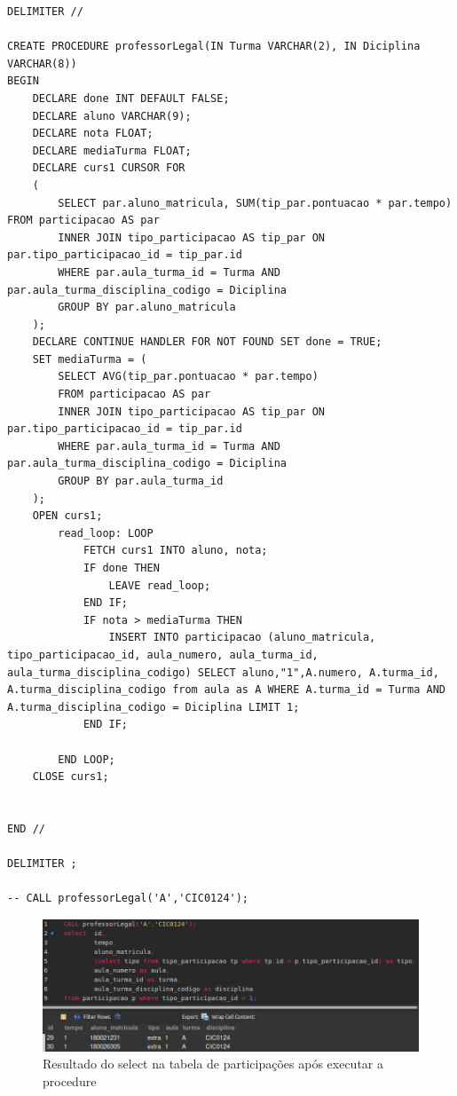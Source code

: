 \documentclass[12pt]{article}
\begin{document}
\begin{lstlisting}
DELIMITER //

CREATE PROCEDURE professorLegal(IN Turma VARCHAR(2), IN Diciplina VARCHAR(8))
BEGIN
    DECLARE done INT DEFAULT FALSE;
    DECLARE aluno VARCHAR(9);
    DECLARE nota FLOAT;
    DECLARE mediaTurma FLOAT;
    DECLARE curs1 CURSOR FOR 
    (
        SELECT par.aluno_matricula, SUM(tip_par.pontuacao * par.tempo) FROM participacao AS par 
        INNER JOIN tipo_participacao AS tip_par ON par.tipo_participacao_id = tip_par.id
        WHERE par.aula_turma_id = Turma AND par.aula_turma_disciplina_codigo = Diciplina
        GROUP BY par.aluno_matricula
    );
    DECLARE CONTINUE HANDLER FOR NOT FOUND SET done = TRUE;
    SET mediaTurma = (
        SELECT AVG(tip_par.pontuacao * par.tempo) 
        FROM participacao AS par 
        INNER JOIN tipo_participacao AS tip_par ON par.tipo_participacao_id = tip_par.id
        WHERE par.aula_turma_id = Turma AND par.aula_turma_disciplina_codigo = Diciplina
        GROUP BY par.aula_turma_id
    );
    OPEN curs1;
        read_loop: LOOP
            FETCH curs1 INTO aluno, nota;
            IF done THEN
                LEAVE read_loop;
            END IF;
            IF nota > mediaTurma THEN
                INSERT INTO participacao (aluno_matricula, tipo_participacao_id, aula_numero, aula_turma_id, aula_turma_disciplina_codigo) SELECT aluno,"1",A.numero, A.turma_id, A.turma_disciplina_codigo from aula as A WHERE A.turma_id = Turma AND A.turma_disciplina_codigo = Diciplina LIMIT 1;
            END IF;

        END LOOP;
    CLOSE curs1;


END //

DELIMITER ;

-- CALL professorLegal('A','CIC0124');
\end{lstlisting}

\begin{figure}[H]
	\centering
    \includegraphics[width=1\textwidth]{professor_legal.png}
    \caption{Resultado do select na tabela de participações após executar a procedure}
\end{figure}
\end{document}

